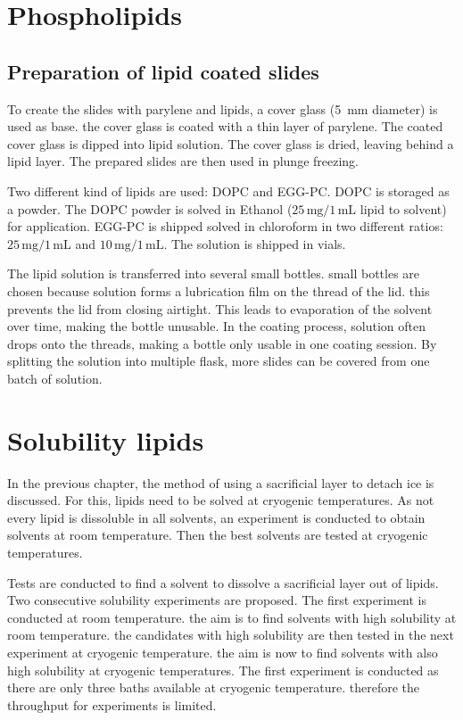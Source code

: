 \section{Phospholipids}
\label{section:metodeLipide}

\subsection{Preparation of lipid coated slides}

To create the slides with parylene and lipids, a cover glass (\SI{5}{\milli\meter} diameter) is used as base. the cover glass is coated with a thin layer of parylene. The coated cover glass is dipped into lipid solution. The cover glass is dried, leaving behind a lipid layer. The prepared slides are then used in plunge freezing.

Two different kind of lipids are used: DOPC and EGG-PC. DOPC is storaged as a powder. The DOPC powder is solved in Ethanol ($25\,\si{\milli\gram}/1\,\si{\milli\liter}$ lipid to solvent) for application. 
EGG-PC is shipped solved in chloroform in two different ratios: $25\,\si{\milli\gram}/1\,\si{\milli\liter}$ and $10\,\si{\milli\gram}/1\,\si{\milli\liter}$. The solution is shipped in vials.

The lipid solution is transferred into several small bottles. small bottles are chosen because solution forms a lubrication film on the thread of the lid. this prevents the lid from closing airtight. This leads to evaporation of the solvent over time, making the bottle unusable. In the coating process, solution often drops onto the threads, making a bottle only usable in one coating session. By splitting the solution into multiple flask, more slides can be covered from one batch of solution.

\section{Solubility lipids}

In the previous chapter, the method of using a sacrificial layer to detach ice is discussed. For this, lipids need to be solved at cryogenic temperatures. As not every lipid is dissoluble in all solvents, an experiment is conducted to obtain solvents at room temperature. Then the best solvents are tested at cryogenic temperatures.

Tests are conducted to find a solvent to dissolve a sacrificial layer out of lipids. Two consecutive solubility experiments are proposed. The first experiment is conducted at room temperature. the aim is to find solvents with high solubility at room temperature. the candidates with high solubility are then tested in the next experiment at cryogenic temperature. the aim is now to find solvents with also high solubility at cryogenic temperatures. The first experiment is conducted as there are only three baths available at cryogenic temperature. therefore the throughput for experiments is limited.

